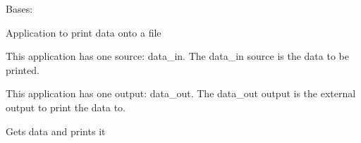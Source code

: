 \documentclass[letterpaper,10pt,english]{sphinxmanual}
\begin{document}
\begin{fulllineitems}
\label{\detokenize{dalio.application:dalio.application.FilePrinter}}
Bases: {\hyperref[\detokenize{dalio.application:dalio.application.application.Application}]{}}

Application to print data onto a file

This application has one source: data\_in. The data\_in source is the data
to be printed.

This application has one output: data\_out. The data\_out output is the
external output to print the data to.

\begin{fulllineitems}
\label{\detokenize{dalio.application:dalio.application.FilePrinter.run}}
Gets data and prints it

\end{fulllineitems}


\end{fulllineitems}

\end{document}
